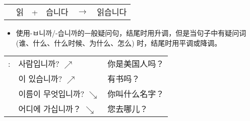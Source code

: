 \begin{grammar}
\begin{grammarsect}
\begin{tabular}{llllll}
            &읽&+&습니다&$\to$&읽습니다\\
        \end{tabular}
    \end{grammarsect}
    \begin{itemize}
        \item 使用-ㅂ니까/-습니까的ᅳ般疑问句，结尾时用升调，但是当句子中有疑问词 (谁、什么、什么时候、为什么、怎么) 时，结尾时用平调或降调。
    \end{itemize}
    \begin{tabular}{lll}
            \ruby{例}{예}:&\ruby{美國}{미국} 사람입니까? $\nearrow$&你是美国人吗？\\
            &\ruby{冊}{책}이 있습니까? $\nearrow$&有书吗？\\
            &이름이 무엇입니까? $\searrow$&你叫什么名字？\\
            &어디에 가십니까？ $\searrow$&您去哪儿？
        \end{tabular}\\
\end{grammar}
